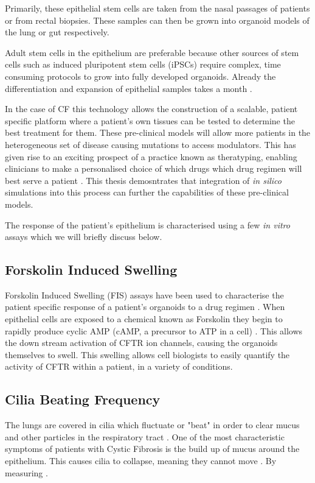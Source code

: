 Primarily, these epithelial stem cells are taken from the nasal passages of patients or from rectal biopsies. These samples can then be grown into organoid models of the lung or gut respectively. 

Adult stem cells in the epithelium are preferable because other sources of stem cells such as induced pluripotent stem cells (iPSCs) require complex, time consuming protocols to grow into fully developed organoids. Already the differentiation and expansion of epithelial samples takes a month \cite{}.

In the case of CF this technology allows the construction of a scalable, patient specific platform where a patient's own tissues can be tested to determine the best treatment for them. These pre-clinical models will allow more patients in the heterogeneous set of disease causing mutations to access modulators. This has given rise to an exciting prospect of a practice known as theratyping, enabling clinicians to make a personalised choice of which drugs which drug regimen will best serve a patient \cite{clancy2019, wong2022, wong2022a, ciciriello2022}. This thesis demosntrates that integration of \textit{in silico} simulations into this process can further the capabilities of these pre-clinical models.

The response of the patient's epithelium is characterised using a few \textit{in vitro} assays which we will briefly discuss below. 

\subsection{Forskolin Induced Swelling}
Forskolin Induced Swelling (FIS) assays have been used to characterise the patient specific response of a patient's organoids to a drug regimen \cite{dekkers2013}. When epithelial cells are exposed to a chemical known as Forskolin they begin to rapidly produce cyclic AMP (cAMP, a precursor to ATP in a cell) \cite{}. This allows the down stream activation of CFTR ion channels, causing the organoids themselves to swell. This swelling allows cell biologists to easily quantify the activity of CFTR within a patient, in a variety of conditions.

\subsection{Cilia Beating Frequency}
The lungs are covered in cilia which fluctuate or "beat" in order to clear mucus and other particles in the respiratory tract \cite{mitchison2010, bustamante-marin2017}. One of the most characteristic symptoms of patients with Cystic Fibrosis is the build up of mucus around the epithelium. This causes cilia to collapse, meaning they cannot move \cite{}. By measuring .

